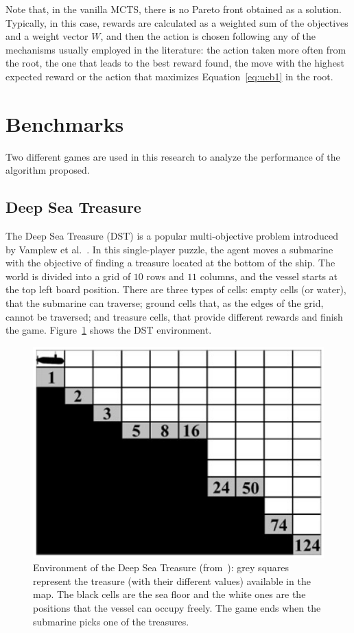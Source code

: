 \documentclass[journal]{IEEEtran}
\begin{document}
Note that, in the vanilla MCTS, there is no Pareto front obtained as a solution. Typically, in this case, rewards are calculated as a weighted sum of the objectives and a weight vector $W$, and then the action is chosen following any of the mechanisms usually employed in the literature: the action taken more often from the root, the one that leads to the best reward found, the move with the highest expected reward or the action that maximizes Equation~\ref{eq:ucb1} in the root.

\section{Benchmarks} \label{sec:bench}

Two different games are used in this research to analyze the performance of the algorithm proposed.

\subsection{Deep Sea Treasure} \label{ssec:dst}

The Deep Sea Treasure (DST) is a popular multi-objective problem introduced by Vamplew et al.~\cite{Vamplew2010}. In this single-player puzzle, the agent moves a submarine with the objective of finding a treasure located at the bottom of the ship. The world is divided into a grid of $10$ rows and $11$ columns, and the vessel starts at the top left board position. There are three types of cells: empty cells (or water), that the submarine can traverse; ground cells that, as the edges of the grid, cannot be traversed; and treasure cells, that provide different rewards and finish the game. Figure~\ref{fig:dstBase} shows the DST environment.

\begin{figure}[!t]
\begin{center}
\includegraphics[width=0.75\columnwidth]{img/dst}
\end{center}
\caption{Environment of the Deep Sea Treasure (from~\cite{Vamplew2010}): grey squares represent the treasure (with their different values) available in the map. The black cells are the sea floor and the white ones are the positions that the vessel can occupy freely. The game ends when the submarine picks one of the treasures.}
\label{fig:dstBase}
\end{figure}
\end{document}
